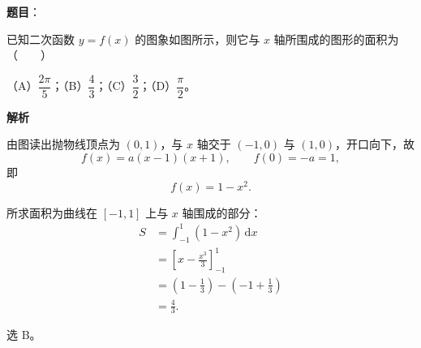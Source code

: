 \begin{answer}

\textbf{题目}：

已知二次函数 $y=f(x)$ 的图象如图所示，则它与 $x$ 轴所围成的图形的面积为\mbox{（　　）}
\nopagebreak[4]
\begin{center}\end{center}
\nopagebreak[4]
（A）$\dfrac{2\pi}{5}$；（B）$\dfrac43$；（C）$\dfrac32$；（D）$\dfrac{\pi}{2}$。

\textbf{解析}

由图读出抛物线顶点为 $(0,1)$，与 $x$ 轴交于 $(-1,0)$ 与 $(1,0)$，开口向下，故
\nopagebreak[4]
\[f(x)=a(x-1)(x+1),\qquad f(0)=-a=1,\]
即
\nopagebreak[4]
\[f(x)=1-x^2.\]

所求面积为曲线在 $[-1,1]$ 上与 $x$ 轴围成的部分：
\nopagebreak[4]
\[\begin{aligned}
S&=\int_{-1}^{1}(1-x^2)\,\mathrm dx\\
&=\left[x-\frac{x^3}{3}\right]_{-1}^{1}\\
&=\left(1-\frac13\right)-\left(-1+\frac13\right)\\
&=\frac43.
\end{aligned}\]

选 B。


\end{answer}
